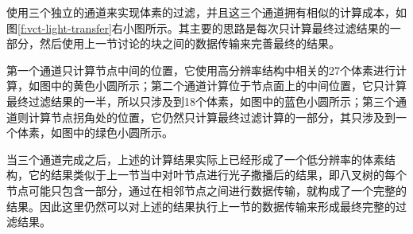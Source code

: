 \cite{a:InteractiveIndirectIlluminationUsingVoxelConeTracing}使用三个独立的通道来实现体素的过滤，并且这三个通道拥有相似的计算成本，如图\ref{f:vct-light-transfer}右小图所示。其主要的思路是每次只计算最终过滤结果的一部分，然后使用上一节讨论的块之间的数据传输来完善最终的结果。

第一个通道只计算节点中间的位置，它使用高分辨率结构中相关的27个体素进行计算，如图中的黄色小圆所示；第二个通道计算位于节点面上的中间位置，它只计算最终过滤结果的一半，所以只涉及到18个体素，如图中的蓝色小圆所示；第三个通道则计算节点拐角处的位置，它仍然只计算最终过滤计算的一部分，其只涉及到一个体素，如图中的绿色小圆所示。

当三个通道完成之后，上述的计算结果实际上已经形成了一个低分辨率的体素结构，它的结果类似于上一节当中对叶节点进行光子撒播后的结果，即八叉树的每个节点可能只包含一部分，通过在相邻节点之间进行数据传输，就构成了一个完整的结果。因此这里仍然可以对上述的结果执行上一节的数据传输来形成最终完整的过滤结果。

